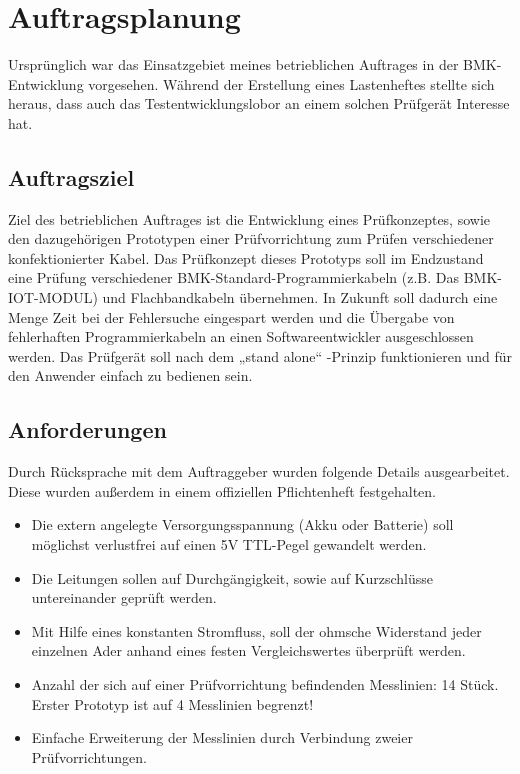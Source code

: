 \section{Auftragsplanung}

Ursprünglich war das Einsatzgebiet meines betrieblichen Auftrages in der BMK-Entwicklung vorgesehen. Während der Erstellung eines Lastenheftes stellte sich heraus, dass auch das Testentwicklungslobor an einem solchen Prüfgerät Interesse hat. 



\subsection{Auftragsziel}

Ziel des betrieblichen Auftrages ist die Entwicklung eines Prüfkonzeptes, sowie den dazugehörigen Prototypen einer Prüfvorrichtung zum Prüfen verschiedener konfektionierter Kabel. Das Prüfkonzept dieses Prototyps soll im Endzustand eine Prüfung verschiedener BMK-Standard-Programmierkabeln (z.B. Das BMK-IOT-MODUL) und Flachbandkabeln übernehmen. 
In Zukunft soll dadurch eine Menge Zeit bei der Fehlersuche eingespart werden und die Übergabe von fehlerhaften Programmierkabeln an einen Softwareentwickler ausgeschlossen werden.
Das Prüfgerät soll nach dem „stand alone“ -Prinzip funktionieren und für den Anwender einfach zu bedienen sein.


\subsection{Anforderungen}

Durch Rücksprache mit dem Auftraggeber wurden folgende Details ausgearbeitet. Diese wurden außerdem in einem offiziellen Pflichtenheft festgehalten. 

\begin{itemize}
	\item{Die extern angelegte Versorgungsspannung (Akku oder Batterie) soll möglichst verlustfrei auf einen 5V TTL-Pegel gewandelt werden. }

	\item{Die Leitungen sollen auf Durchgängigkeit, sowie auf Kurzschlüsse untereinander geprüft werden.}
	
	\item{Mit Hilfe eines konstanten Stromfluss, soll der ohmsche Widerstand jeder einzelnen Ader anhand eines festen Vergleichswertes überprüft werden.}
	
	\item{Anzahl der sich auf einer Prüfvorrichtung befindenden Messlinien: 14 Stück.
Erster Prototyp ist auf 4 Messlinien begrenzt!}

	\item{Einfache Erweiterung der Messlinien durch Verbindung zweier Prüfvorrichtungen.}
\end{itemize}


